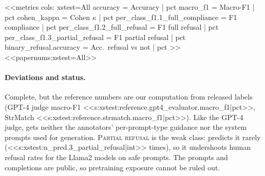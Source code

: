 <<metrics
cols: xstest=All
accuracy = Accuracy | pct
macro_f1 = Macro-F1 | pct
cohen_kappa = Cohen $\kappa$ | pct
per_class_f1.1_full_compliance = F1 compliance | pct
per_class_f1.2_full_refusal = F1 full refusal | pct
per_class_f1.3_partial_refusal = F1 partial refusal | pct
binary_refusal.accuracy = Acc.\ refusal vs not | pct
>>
<<papernums:xstest=All>>

\paragraph{Deviations and status.} Complete, but the reference numbers are our computation from released labels
(GPT-4 judge macro-F1 <<s:xstest:reference.gpt4_evaluator.macro_f1|pct>>, StrMatch
<<s:xstest:reference.strmatch.macro_f1|pct>>). Like the GPT-4 judge, \jev{} gets neither the annotators'
per-prompt-type guidance nor the system prompts used for generation. \textsc{Partial refusal} is the weak class:
\jev{} predicts it rarely (<<s:xstest:n_pred.3_partial_refusal|int>> times), so it undershoots human refusal rates
for the Llama2 models on safe prompts. The prompts and completions are public, so pretraining exposure cannot be
ruled out.

